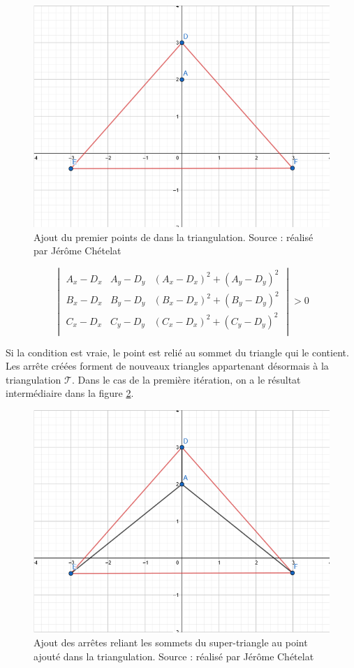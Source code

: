 \begin{figure}[htbp!]
    \centering
    \includegraphics[width=0.66\linewidth]{figures/bowyer-watson/step_4.png}
    \caption{Ajout du premier points de dans la triangulation. Source : réalisé par
	Jérôme Chételat}
	\label{fig:triangulation_step_4}
\end{figure}

$$
\begin{vmatrix}
 A_x - D_x & A_y - D_y & (A_x - D_x)^2 + (A_y - D_y)^2 \\
 B_x - D_x & B_y - D_y & (B_x - D_x)^2 + (B_y - D_y)^2 \\
 C_x - D_x & C_y - D_y & (C_x - D_x)^2 + (C_y - D_y)^2 \\
\end{vmatrix} > 0
$$

Si la condition est vraie, le point est relié au sommet du triangle qui le contient.
Les arrête créées forment de nouveaux triangles appartenant désormais à la
triangulation $\mathcal{T}$. Dans le cas de la première itération, on a le
résultat intermédiaire dans la figure \ref{fig:triangulation_step_5}.

\begin{figure}[htbp!]
    \centering
    \includegraphics[width=0.66\linewidth]{figures/bowyer-watson/step_5.png}
    \caption{Ajout des arrêtes reliant les sommets du super-triangle au point
		ajouté dans la triangulation. Source : réalisé par
	Jérôme Chételat}
	\label{fig:triangulation_step_5}
\end{figure}

